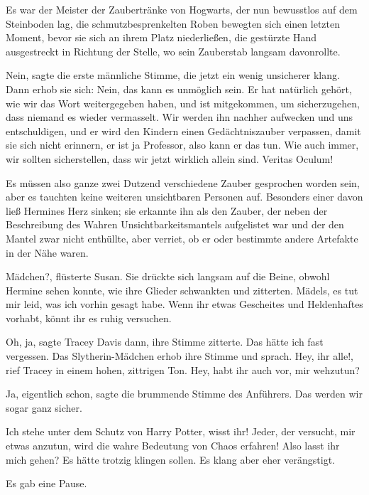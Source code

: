 Es war der Meister der Zaubertränke von Hogwarts, der nun bewusstlos auf dem
Steinboden lag, die schmutzbesprenkelten Roben bewegten sich einen letzten
Moment, bevor sie sich an ihrem Platz niederließen, die gestürzte Hand
ausgestreckt in Richtung der Stelle, wo sein Zauberstab langsam davonrollte.

\glqq{}Nein\grqq{}, sagte die erste männliche Stimme, die jetzt ein wenig
unsicherer klang. Dann erhob sie sich: \glqq{}Nein, das kann es unmöglich sein.
Er hat natürlich gehört, wie wir das Wort weitergegeben haben, und ist
mitgekommen, um sicherzugehen, dass niemand es wieder vermasselt. Wir werden ihn
nachher aufwecken und uns entschuldigen, und er wird den Kindern einen
Gedächtniszauber verpassen, damit sie sich nicht erinnern, er ist ja Professor,
also kann er das tun. Wie auch immer, wir sollten sicherstellen, dass wir jetzt
wirklich allein sind. Veritas Oculum!\grqq{}

Es müssen also ganze zwei Dutzend verschiedene Zauber gesprochen worden sein,
aber es tauchten keine weiteren unsichtbaren Personen auf. Besonders einer davon
ließ Hermines Herz sinken; sie erkannte ihn als den Zauber, der neben der
Beschreibung des Wahren Unsichtbarkeitsmantels aufgelistet war und der den
Mantel zwar nicht enthüllte, aber verriet, ob er oder bestimmte andere Artefakte
in der Nähe waren.

\glqq{}Mädchen?\grqq{}, flüsterte Susan. Sie drückte sich langsam auf die Beine,
obwohl Hermine sehen konnte, wie ihre Glieder schwankten und zitterten. \glqq{}
Mädels, es tut mir leid, was ich vorhin gesagt habe. Wenn ihr etwas Gescheites
und Heldenhaftes vorhabt, könnt ihr es ruhig versuchen.\grqq{}

\glqq{}Oh, ja\grqq{}, sagte Tracey Davis dann, ihre Stimme zitterte. \glqq{}Das
hätte ich fast vergessen.\grqq{} Das Slytherin-Mädchen erhob ihre Stimme und
sprach. \glqq{}Hey, ihr alle!\grqq{}, rief Tracey in einem hohen, zittrigen Ton.
\glqq{}Hey, habt ihr auch vor, mir wehzutun?\grqq{}

\glqq{}Ja, eigentlich schon\grqq{}, sagte die brummende Stimme des Anführers.
\glqq{}Das werden wir sogar ganz sicher.\grqq{}

\glqq{}Ich stehe unter dem Schutz von Harry Potter, wisst ihr! Jeder, der
versucht, mir etwas anzutun, wird die wahre Bedeutung von Chaos erfahren! Also
lasst ihr mich gehen?\grqq{} Es hätte trotzig klingen sollen. Es klang aber eher
verängstigt.

Es gab eine Pause.

